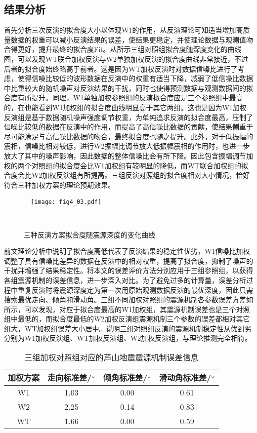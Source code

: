 \subsection{结果分析}
首先分析三次反演的拟合度大小以体现W1的作用，从反演理论可知适当增加高质量数据的权重可以减小反演结果的误差，使结果更稳定，并使理论数据与观测值吻合得更好，提升最终的拟合度Fit。从所示三组对照组拟合度随深度变化的曲线图，可以发现WT联合加权反演与W2单独加权反演的拟合度曲线非常接近，不过后者的拟合度始终略高于前者。这是因为WT加权反演时对数据信噪比进行了考虑，使得信噪比较低的波形数据在反演中的权重有适当下降，减弱了低信噪比数据中比重较大的随机噪声对反演结果的干扰，同时也使得预测数据与观测数据间的拟合度有所提升。同理，W1单独加权参照组的反演拟合度应是三个参照组中最高的，在也能看到W1加权组的拟合度曲线明显高于其它两组。这也是因为W1加权反演组是基于数据随机噪声强度调节权重，为单纯追求反演的拟合度最高，压制了信噪比较低的数据在反演中的作用，而提高了高信噪比数据的贡献，使结果侧重于尽可能满足与高信噪比数据的吻合，最终拟合度也随之提升。此外，对于低振幅的震相，信噪比相对较低，进行W2振幅比调节放大低振幅震相的作用时，也进一步放大了其中的噪声影响，因此数据的整体信噪比会有所下降。因此包含振幅调节加权的两个对照组的拟合度会比W1加权组有较明显的降低，而WT联合加权组的拟合度会比W2加权反演组有所提高。三组反演对照组的拟合度相对大小情况，恰好符合三种加权方案的理论预期效果。
\begin{figure}
\centering
  \texttt{[image: fig4\_03.pdf]}
  \caption{三种反演方案拟合度随震源深度的变化曲线}
  \label{fig4_03}
\end{figure}

前文理论分析中说明了拟合度高低代表了反演结果的稳定性优劣，W1信噪比加权调整了具有信噪比差异的数据在反演中的相对权重，提高了拟合度，抑制了噪声的干扰并增强了结果稳定性。将本文的误差评价方法分别应用于三组参照组，以获得各组震源机制的误差信息，进一步深入对比。为了避免过多的计算量，误差分析过程中重复反演时将震源深度定为第一次用原始观测数据反演的最优深度，因此只需搜索最优走向、倾角和滑动角。三组不同加权对照组的震源机制各参数误差方差如所示，可以发现，对应于拟合度最高的W1加权组，其震源机制误差也是三个对照组中最低的，而拟合度最低的W2加权反演组震源机制三个参数的误差都相对其它组大，WT加权组误差大小居中。说明三组对照组反演的震源机制稳定性从优到劣分别为W1加权反演组、WT加权反演组、W2加权反演组，与理论推测完全相符。

\begin{table}[ht]
\centering
\caption{三组加权对照组对应的芦山地震震源机制误差信息}
\label{tab4_02}
    \begin{tabular}{c c c c}
    \hline
    加权方案 & 走向标准差/$^\circ$ & 倾角标准差/$^\circ$ & 滑动角标准差/$^\circ$\\
    \hline
    W1		&  1.03     &    0.00   & 0.61 \\
    W2		&  2.25     &    0.14   & 0.83 \\
    WT		&  1.66     &    0.00	& 0.59 \\
    \hline
    \end{tabular}
\end{table}

